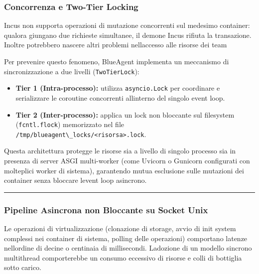 \subsubsection{Concorrenza e Two-Tier
Locking}\label{concorrenza-e-two-tier-locking}

Incus non supporta operazioni di mutazione concorrenti sul medesimo
container: qualora giungano due richieste simultanee, il demone Incus
rifiuta la transazione. Inoltre potrebbero nascere altri problemi
nell\textquotesingle accesso alle risorse dei team

Per prevenire questo fenomeno, BlueAgent implementa un meccanismo di
sincronizzazione a due livelli (\passthrough{\lstinline!TwoTierLock!}):

\begin{itemize}
\tightlist
\item
  \textbf{Tier 1 (Intra-processo):} utilizza
  \passthrough{\lstinline!asyncio.Lock!} per coordinare e serializzare
  le coroutine concorrenti all\textquotesingle interno del singolo event
  loop.
\item
  \textbf{Tier 2 (Inter-processo):} applica un lock non bloccante sul
  filesystem (\passthrough{\lstinline!fcntl.flock!}) memorizzato nel
  file \passthrough{\lstinline!/tmp/blueagent\_locks/<risorsa>.lock!}.
\end{itemize}

Questa architettura protegge le risorse sia a livello di singolo
processo sia in presenza di server ASGI multi-worker (come Uvicorn o
Gunicorn configurati con molteplici worker di sistema), garantendo mutua
esclusione sulle mutazioni dei container senza bloccare
l\textquotesingle event loop asincrono.

\begin{center}\rule{0.5\linewidth}{0.5pt}\end{center}

\subsubsection{Pipeline Asincrona non Bloccante su Socket
Unix}\label{pipeline-asincrona-non-bloccante-su-socket-unix}

Le operazioni di virtualizzazione (clonazione di storage, avvio di init
system complessi nei container di sistema, polling delle operazioni)
comportano latenze nell\textquotesingle ordine di decine o centinaia di
millisecondi. L\textquotesingle adozione di un modello sincrono
multithread comporterebbe un consumo eccessivo di risorse e colli di
bottiglia sotto carico.


